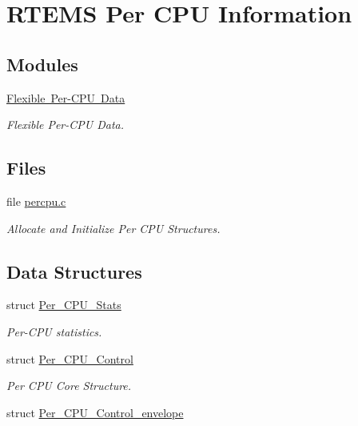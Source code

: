 \hypertarget{group__PerCPU}{}\section{R\+T\+E\+MS Per C\+PU Information}
\label{group__PerCPU}
\subsection*{Modules}
\begin{DoxyCompactItemize}
\item 
\mbox{\hyperlink{group__PerCPUData}{Flexible Per-\/\+C\+P\+U Data}}
\begin{DoxyCompactList}\small\item\em Flexible Per-\/\+C\+PU Data. \end{DoxyCompactList}\end{DoxyCompactItemize}
\subsection*{Files}
\begin{DoxyCompactItemize}
\item 
file \mbox{\hyperlink{percpu_8c}{percpu.\+c}}
\begin{DoxyCompactList}\small\item\em Allocate and Initialize Per C\+PU Structures. \end{DoxyCompactList}\end{DoxyCompactItemize}
\subsection*{Data Structures}
\begin{DoxyCompactItemize}
\item 
struct \mbox{\hyperlink{structPer__CPU__Stats}{Per\+\_\+\+C\+P\+U\+\_\+\+Stats}}
\begin{DoxyCompactList}\small\item\em Per-\/\+C\+PU statistics. \end{DoxyCompactList}\item 
struct \mbox{\hyperlink{structPer__CPU__Control}{Per\+\_\+\+C\+P\+U\+\_\+\+Control}}
\begin{DoxyCompactList}\small\item\em Per C\+PU Core Structure. \end{DoxyCompactList}\item 
struct \mbox{\hyperlink{structPer__CPU__Control__envelope}{Per\+\_\+\+C\+P\+U\+\_\+\+Control\+\_\+envelope}}
\end{DoxyCompactItemize}
